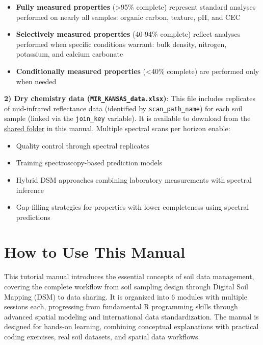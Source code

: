 \documentclass[
  10pt,
  b5paper,
  oneside]{book}
\providecommand{\tightlist}{%
  \setlength{\itemsep}{0pt}\setlength{\parskip}{0pt}}
\begin{document}
\begin{itemize}
\tightlist
\item
  \textbf{Fully measured properties} (\textgreater95\% complete) represent standard analyses performed on nearly all samples: organic carbon, texture, pH, and CEC
\item
  \textbf{Selectively measured properties} (40-94\% complete) reflect analyses performed when specific conditions warrant: bulk density, nitrogen, potassium, and calcium carbonate
\item
  \textbf{Conditionally measured properties} (\textless40\% complete) are performed only when needed
\end{itemize}

\textbf{2) Dry chemistry data (\texttt{MIR\_KANSAS\_data.xlsx})}: This file includes replicates of mid-infrared reflectance data (identified by \texttt{scan\_path\_name}) for each soil sample (linked via the \texttt{join\_key} variable). It is available to download from the \href{https://drive.google.com/drive/folders/1qaD6-psvOH-Mmt3RvFIHnhV7vnr26z21?usp=drive_link}{shared folder} in this manual. Multiple spectral scans per horizon enable:

\begin{itemize}
\tightlist
\item
  Quality control through spectral replicates
\item
  Training spectroscopy-based prediction models
\item
  Hybrid DSM approaches combining laboratory measurements with spectral inference
\item
  Gap-filling strategies for properties with lower completeness using spectral predictions
\end{itemize}

\section*{How to Use This Manual}\label{how-to-use-this-manual}

This tutorial manual introduces the essential concepts of soil data management, covering the complete workflow from soil sampling design through Digital Soil Mapping (DSM) to data sharing. It is organized into 6 modules with multiple sessions each, progressing from fundamental R programming skills through advanced spatial modeling and international data standardization. The manual is designed for hands-on learning, combining conceptual explanations with practical coding exercises, real soil datasets, and spatial data workflows.
\end{document}
